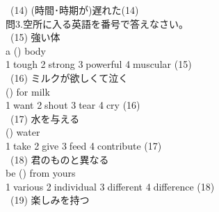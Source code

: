 \documentclass[uplatex]{jsarticle}
\begin{document}
\ (14) (時間･時期が)遅れた\hspace{\fill}(14)\underline{\hspace{35mm}}\\
\Large 問3.空所に入る英語を番号で答えなさい。\\
\large\ (15) 強い体\\
\hspace{10mm}a (\hspace{10mm}) body\\
\hspace{10mm}\textcircled{\normalsize1}tough \textcircled{\normalsize2}strong 
\textcircled{\normalsize3}powerful \textcircled{\normalsize4}muscular 
\hspace{\fill}(15)\underline{\hspace{35mm}}\\
\ (16) ミルクが欲しくて泣く\\
\hspace{10mm}(\hspace{10mm}) for milk\\
\hspace{10mm}\textcircled{\normalsize1}want \textcircled{\normalsize2}shout 
\textcircled{\normalsize3}tear \textcircled{\normalsize4}cry 
\hspace{\fill}(16)\underline{\hspace{35mm}}\\
\ (17) 水を与える\\
\hspace{10mm}(\hspace{10mm}) water\\
\hspace{10mm}\textcircled{\normalsize1}take \textcircled{\normalsize2}give 
\textcircled{\normalsize3}feed \textcircled{\normalsize4}contribute 
\hspace{\fill}(17)\underline{\hspace{35mm}}\\
\ (18) 君のものと異なる\\
\hspace{10mm}be (\hspace{10mm}) from yours\\
\hspace{10mm}\textcircled{\normalsize1}various \textcircled{\normalsize2}individual 
\textcircled{\normalsize3}different \textcircled{\normalsize4}difference 
\hspace{\fill}(18)\underline{\hspace{35mm}}\\
\ (19) 楽しみを持つ\\
\end{document}
